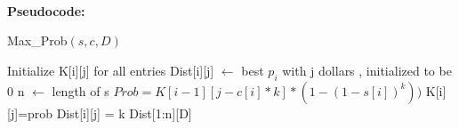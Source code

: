 \documentclass[twoside]{homework}
\begin{document}
\\\textbf{Pseudocode:} \quad
\begin{algorithm}
	\caption*{Max\_Prob$(s,c,D)$}
	\begin{algorithmic}
		\STATE Initialize K[i][j] for all entries
		\STATE Dist[i][j] $\leftarrow$ best $p_i$ with j dollars , initialized to be 0
		\STATE n $\leftarrow$ length of s	
		\STATE $Prob = K[i-1][j-c[i]*k]*(1-(1-s[i])^k))$
		\STATE K[i][j]=prob
		\STATE Dist[i][j] = k
		\ENDIF
		\ENDFOR
		\ENDFOR
		\ENDFOR
		\RETURN Dist[1:n][D]
	\end{algorithmic}
\end{algorithm}
\end{document}
